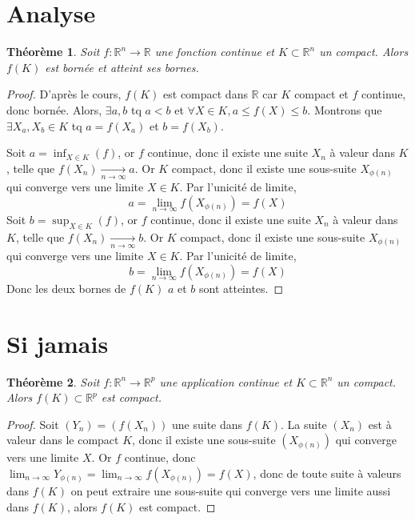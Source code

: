 \documentclass[a4paper]{article}
\newcommand{\R}{\mathbb{R}}
\newtheorem{theoreme}{Théorème}[section]
\begin{document}
\section{Analyse}
\begin{theoreme}
    Soit $f: \R^n \to \R$ une fonction continue et $K \subset \R^n$ un compact. Alors $f(K)$ est bornée et atteint ses bornes.
\end{theoreme}
\begin{proof}
   D'après le cours, $f(K)$ est compact dans  $\R$ car $K$ compact et  $f$ continue, donc bornée. Alors, $\exists a, b$ tq $a < b$ et  $\forall X \in K, a \le f(X) \le b$. Montrons que $\exists X_a, X_b \in K$ tq $a = f(X_a)$ et  $b = f(X_b)$.
   \par
   Soit  $a = \inf_{X \in K}(f)$, or  $f$ continue, donc  il existe une suite $X_n$ à valeur dans $K$, telle que  $f(X_n) \xrightarrow[n \to \infty]{} a$. Or $K$ compact, donc  il existe une sous-suite $X_{\phi(n)}$ qui converge vers une limite $X \in K$. Par l'unicité de limite, 
   \[
       a = \lim_{n \to \infty} f(X_{\phi(n)}) = f(X)
   \] 
   Soit  $b = \sup_{X \in K}(f)$, or  $f$ continue, donc  il existe une suite $X_n$ à valeur dans $K$, telle que  $f(X_n) \xrightarrow[n \to \infty]{} b$. Or $K$ compact, donc  il existe une sous-suite $X_{\phi(n)}$ qui converge vers une limite $X \in K$. Par l'unicité de limite, 
   \[
       b = \lim_{n \to \infty} f(X_{\phi(n)}) = f(X)
   \] 
   Donc les deux bornes de $f(K)$  $a$ et  $b$ sont atteintes.
\end{proof}

\section{Si jamais}
\begin{theoreme}
    Soit $f: \R^n \to \R^p$ une application continue et $K \subset \R^n$ un compact. Alors $f(K) \subset \R^p$ est compact.    
\end{theoreme}
\begin{proof}
    Soit $(Y_n) = (f(X_n))$ une suite dans  $f(K)$. La suite  $(X_n)$ est à valeur dans le compact  $K$, donc il existe une sous-suite  $(X_{\phi(n)})$ qui converge vers une limite $X$. Or  $f$ continue, donc  $\lim_{n \to \infty} Y_{\phi(n)} = \lim_{n \to \infty} f(X_{\phi(n)}) = f(X)$, donc de toute suite à valeurs dans $f(K)$ on peut extraire une sous-suite qui converge vers une limite aussi dans $f(K)$, alors  $f(K)$ est compact.
\end{proof}
\end{document}
